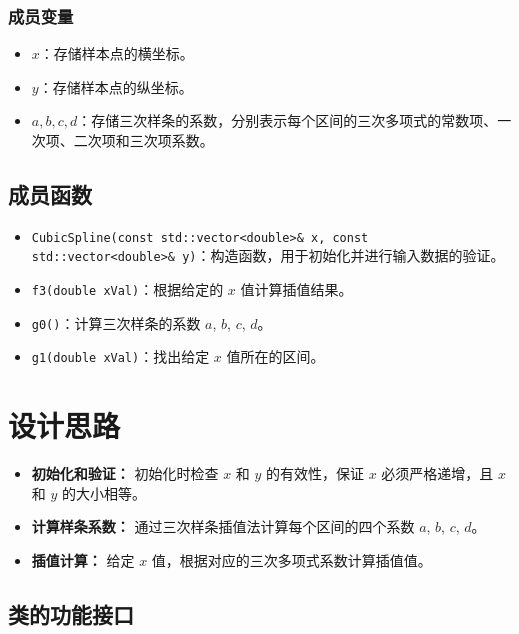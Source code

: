 \documentclass[a4paper]{article}
\begin{document}
\subsubsection{成员变量}
\begin{itemize}
    \item \( x \)：存储样本点的横坐标。
    \item \( y \)：存储样本点的纵坐标。
    \item \( a, b, c, d \)：存储三次样条的系数，分别表示每个区间的三次多项式的常数项、一次项、二次项和三次项系数。
\end{itemize}

\subsection{成员函数}
\begin{itemize}
    \item \texttt{CubicSpline(const std::vector<double>& x, const std::vector<double>& y)}：构造函数，用于初始化并进行输入数据的验证。
    \item \texttt{f3(double xVal)}：根据给定的 \( x \) 值计算插值结果。
    \item \texttt{g0()}：计算三次样条的系数 \( a \), \( b \), \( c \), \( d \)。
    \item \texttt{g1(double xVal)}：找出给定 \( x \) 值所在的区间。
\end{itemize}

\section{设计思路}

\begin{itemize}
    \item \textbf{初始化和验证：} 初始化时检查 \( x \) 和 \( y \) 的有效性，保证 \( x \) 必须严格递增，且 \( x \) 和 \( y \) 的大小相等。
    \item \textbf{计算样条系数：} 通过三次样条插值法计算每个区间的四个系数 \( a \), \( b \), \( c \), \( d \)。
    \item \textbf{插值计算：} 给定 \( x \) 值，根据对应的三次多项式系数计算插值值。
\end{itemize}

\subsection{类的功能接口}
\end{document}
